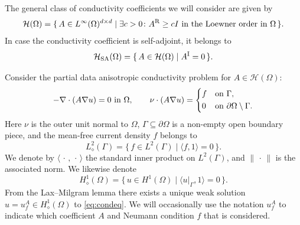 \documentclass[reqno]{amsart}
\numberwithin{equation}{section}
\numberwithin{figure}{section}
\numberwithin{table}{section}
\theoremstyle{plain}
\theoremstyle{definition}
\theoremstyle{remark}
\newcommand{\norm}[1]{\lVert#1\rVert}
\newcommand{\inner}[1]{\langle#1\rangle}
\newcommand{\upR}{^{\textup{R}}}
\newcommand{\upI}{^{\textup{I}}}
\newcommand{\AR}{A\upR}
\newcommand{\AI}{A\upI}
\newcommand{\Hsa}{\mathcal{H}_{\textup{SA}}}
\begin{document}
	The general class of conductivity coefficients we will consider are given by
	\begin{equation*}
		\mathcal{H}(\Omega) = \{\, A\in L^\infty(\Omega)^{d\times d} \mid \exists c>0 \colon \AR \geq c I \text{ in the Loewner order in $\Omega$} \,\}.
	\end{equation*}
	In case the conductivity coefficient is self-adjoint, it belongs to
	\begin{equation*}
		\Hsa(\Omega) = \{\, A\in\mathcal{H}(\Omega) \mid \AI = 0 \,\}.
	\end{equation*}
	
	Consider the partial data anisotropic conductivity problem for $A\in\mathcal{H}(\Omega)$: 
	\begin{equation} \label{eq:condeq}
		-\nabla\cdot(A\nabla u) = 0 \text{ in } \Omega, \qquad 	\nu\cdot(A\nabla u) = \begin{dcases}
			f & \text{on } \Gamma, \\
			0 & \text{on } \partial\Omega\setminus\Gamma.
		\end{dcases}
	\end{equation}
	Here $\nu$ is the outer unit normal to $\Omega$, $\Gamma\subseteq \partial \Omega$ is a non-empty open boundary piece, and the mean-free current density $f$ belongs to
	\begin{equation*}
		L^2_\diamond(\Gamma) = \{\, f\in L^2(\Gamma) \mid \inner{f,1} = 0 \,\}.
	\end{equation*}
	We denote by $\inner{\,\cdot\,,\,\cdot\,}$ the standard inner product on $L^2(\Gamma)$, and $\norm{\,\cdot\,}$ is the associated norm. We likewise denote
	\begin{equation*}
		H^1_\diamond(\Omega) = \{\, u\in H^1(\Omega) \mid \inner{u|_\Gamma,1} = 0 \,\}.
	\end{equation*}
	From the Lax--Milgram lemma there exists a unique weak solution $u = u_f^A \in H^1_\diamond(\Omega)$ to \eqref{eq:condeq}. We will occasionally use the notation $u_f^A$ to indicate which coefficient $A$ and Neumann condition $f$ that is considered.
	
\end{document}
